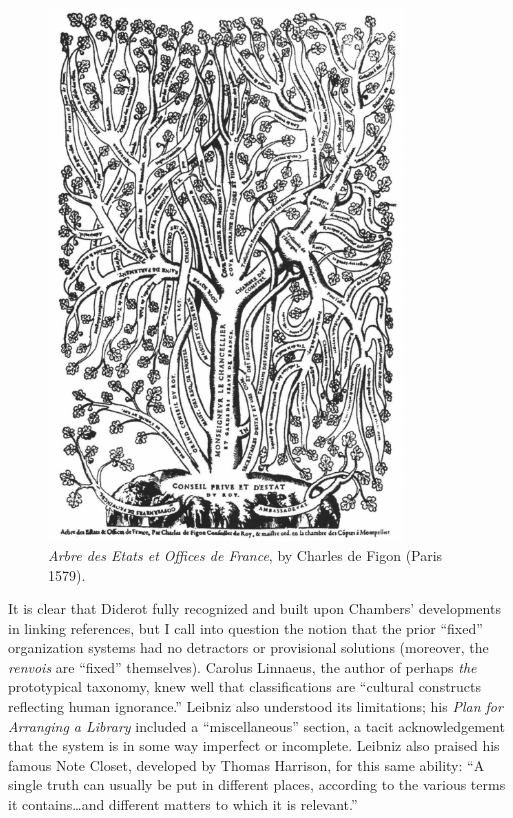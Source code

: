 \begin{figure}[ht]
\centering
\includegraphics[height=400pt]{figures/historictree}
\caption{\emph{Arbre des Etats et Offices de France}, by Charles de Figon (Paris 1579).}
\label{fig:historictree}
\end{figure}

It is clear that Diderot fully recognized and built upon Chambers' developments in linking references, but I call into question the notion that the prior ``fixed'' organization systems had no detractors or provisional solutions (moreover, the \emph{renvois} are ``fixed'' themselves). Carolus Linnaeus, the author of perhaps \emph{the} prototypical taxonomy, knew well that classifications are ``cultural constructs reflecting human ignorance.''\autocite[99]{zimmer_renvois_2009} Leibniz also understood its limitations; his \emph{Plan for Arranging a Library} included a ``miscellaneous'' section, a tacit acknowledgement that the system is in some way imperfect or incomplete.\autocite[106]{burke_social_2000} Leibniz also praised his famous Note Closet, developed by Thomas Harrison, for this same ability: ``A single truth can usually be put in different places, according to the various terms it contains\ldots and different matters to which it is relevant.''\autocite[``Managing Abundant Notes'']{blair_too_2010}

